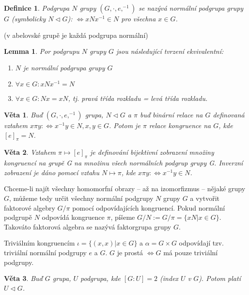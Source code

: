 \documentclass[a4paper, 11pt]{report}
\newtheorem{mydef}{Definice}[chapter]
\newtheorem{veta}{Věta}[chapter]
\newtheorem{lemma}{Lemma}[chapter]
\begin{document}
\begin{mydef}
Podgrupa $N$ grupy $(G, \cdot, e, ^{-1})$ se nazývá normální podgrupa grupy $G$ (symbolicky $N \triangleleft G$): $\Leftrightarrow x N x^{-1} \in N$ pro všechna $x \in G$.
\end{mydef}
(v abelovské grupě je každá podgrupa normální)

\begin{lemma}
Por podgrupu $N$ grupy $G$ jsou následující tvrzení ekvivalentní:
\begin{enumerate}
	\item $N$ je normální podgrupa grupy $G$
	\item $\forall x \in G: x N x^{-1} = N$
	\item $\forall x \in G: N x = x N$, tj. pravá třída rozkladu = levá třída rozkladu.
\end{enumerate}
\end{lemma}

\begin{veta}
Buď $(G, \cdot, e, ^{-1})$ grupa, $N \triangleleft G$ a $\pi$ buď binární relace na $G$ definovaná vztahem $x \pi y: \Leftrightarrow x^{-1}y \in N, x,y \in G$. Potom je $\pi$ relace kongruence na $G$, kde $[e]_\pi = N$.
\end{veta}

\begin{veta}
Vztahem $\pi \mapsto [e]_\pi$ je definování bijektivní zobrazení množiny kongruencí na grupě G na množinu všech normálních podgrup grupy G. Inverzní zobrazení je dáno pomocí vztahu $N \mapsto \pi$, kde $x \pi y: \Leftrightarrow x^{-1}y \in N$.
\end{veta}

Chceme-li najít všechny homomorfní obrazy -- až na izomorfizmus -- nějaké grupy $G$, můžeme tedy určit všechny normální podgrupy $N$ grupy $G$ a vytvořit faktorové algebry $G/\pi$ pomocí odpovídajících kongruencí. Pokud normální podgrupě $N$ odpovídá kongruence $\pi$, píšeme $G/N := G/\pi = \{x N | x \in G\}$. Takováto faktorová algebra se nazývá faktorgrupa grupy $G$.

Triviálním kongruencím $\iota = \{(x, x) | x \in G\}$ a $\alpha = G \times G$ odpovídají tzv. triviální normální podgrupy ${e}$ a $G$. $G$ je prostá $\Leftrightarrow G$ má pouze triviální podgrupy.

\begin{veta}
Buď $G$ grupa, $U$ podgrupa, kde $[G:U] = 2$ (index $U$ v $G$). Potom platí $U \triangleleft G$.
\end{veta}
\end{document}
